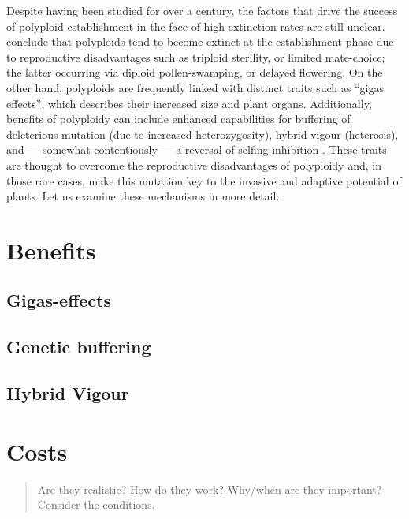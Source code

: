 \documentclass[openany, 12pt, draft]{book}
\begin{document}
Despite having been studied for over a century, the factors that drive the success of polyploid establishment in the face of high extinction rates are still unclear.
\citet{Arrigo2012} conclude that polyploids tend to become extinct at the establishment phase due to reproductive disadvantages such as triploid sterility, or limited mate-choice; the latter occurring via diploid pollen-swamping, or delayed flowering.
On the other hand, polyploids are frequently linked with distinct traits such as ``gigas effects'', which describes their increased size and plant organs.
Additionally, benefits of polyploidy can include enhanced capabilities for buffering of deleterious mutation (due to increased heterozygosity), hybrid vigour (heterosis), and --- somewhat contentiously --- a reversal of selfing inhibition \citep{Woodhouse2009, Ramsey2014}.
These traits are thought to overcome the reproductive disadvantages of polyploidy and, in those rare cases, make this mutation key to the invasive and adaptive potential of plants. Let us examine these mechanisms in more detail:

\hypertarget{benefits}{%
\section{Benefits}\label{benefits}}

\hypertarget{gigas}{%
\subsection{Gigas-effects}\label{gigas}}

\hypertarget{buffering}{%
\subsection{Genetic buffering}\label{buffering}}

\hypertarget{vigour}{%
\subsection{Hybrid Vigour}\label{vigour}}

\hypertarget{costs}{%
\section{Costs}\label{costs}}

\begin{quote}
Are they realistic? How do they work? Why/when are they important? Consider the conditions.
\end{quote}
\end{document}
